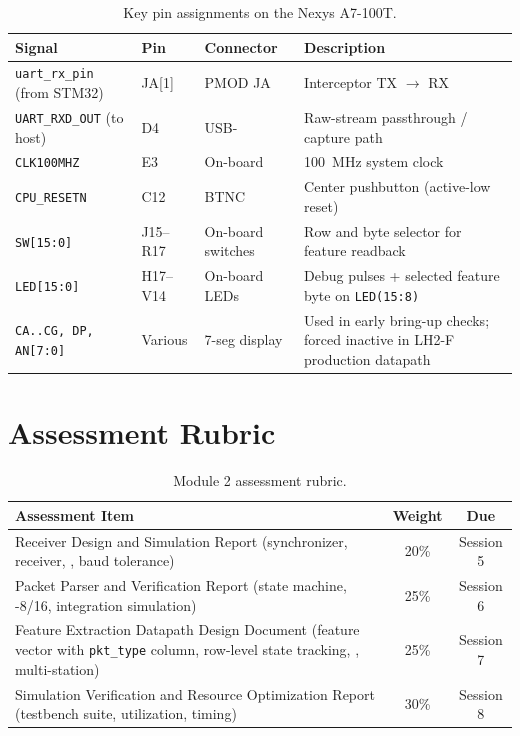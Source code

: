 \documentclass[11pt,letterpaper]{article}
\begin{document}
	\begin{table}[ht!]
		\centering
		\caption{Key \FPGA{} pin assignments on the Nexys A7-100T.}
		\label{tab:pins}
		\renewcommand{\arraystretch}{1.3}
		\begin{tabularx}{\textwidth}{l l l X}
			\toprule
			\textbf{Signal} & \textbf{\FPGA{} Pin} & \textbf{Connector} & \textbf{Description} \\
			\midrule
			\texttt{uart\_rx\_pin} (from STM32) & JA[1] & PMOD JA & Interceptor \MCU{} TX $\rightarrow$ \FPGA{} RX \\
			\texttt{UART\_RXD\_OUT} (to host) & D4 & USB-\UART{} & Raw-stream passthrough / capture path \\
			\texttt{CLK100MHZ} & E3 & On-board & 100~MHz system clock \\
			\texttt{CPU\_RESETN} & C12 & BTNC & Center pushbutton (active-low reset) \\
			\texttt{SW[15:0]} & J15--R17 & On-board switches & Row and byte selector for feature readback \\
			\texttt{LED[15:0]} & H17--V14 & On-board LEDs & Debug pulses + selected feature byte on \texttt{LED(15:8)} \\
			\texttt{CA..CG, DP, AN[7:0]} & Various & 7-seg display & Used in early bring-up checks; forced inactive in LH2-F production datapath \\
			\bottomrule
		\end{tabularx}
	\end{table}

	\section{Assessment Rubric}

	\begin{table}[ht!]
		\centering
		\caption{Module 2 assessment rubric.}
		\label{tab:rubric}
		\renewcommand{\arraystretch}{1.3}
		\begin{tabularx}{\textwidth}{X c c}
			\toprule
			\textbf{Assessment Item} & \textbf{Weight} & \textbf{Due} \\
			\midrule
			\UART{} Receiver Design and Simulation Report (synchronizer, receiver, \FIFO{}, baud tolerance) & 20\% & Session 5 \\
			Packet Parser and \CRC{} Verification Report (state machine, \CRC{}-8/16, integration simulation) & 25\% & Session 6 \\
			Feature Extraction Datapath Design Document (feature vector with \texttt{pkt\_type} column, row-level state tracking, \BRAM{}, multi-station) & 25\% & Session 7 \\
			Simulation Verification and Resource Optimization Report (testbench suite, utilization, timing) & 30\% & Session 8 \\
			\bottomrule
		\end{tabularx}
	\end{table}
\end{document}
